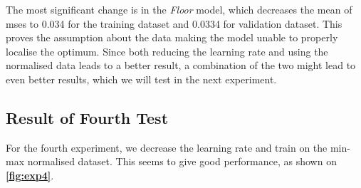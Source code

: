 
The most significant change is in the \textit{Floor} model, which decreases the mean of \gls{mse}s to 0.034 for the training dataset and 0.0334 for validation dataset. This proves the assumption about the data making the model unable to properly localise the optimum. Since both reducing the learning rate and using the normalised data leads to a better result, a combination of the two might lead to even better results, which we will test in the next experiment.

\subsection{Result of Fourth Test}
For the fourth experiment, we decrease the learning rate and train on the min-max normalised dataset. This seems to give good performance, as shown on \textbf{\autoref{fig:exp4}}.%

